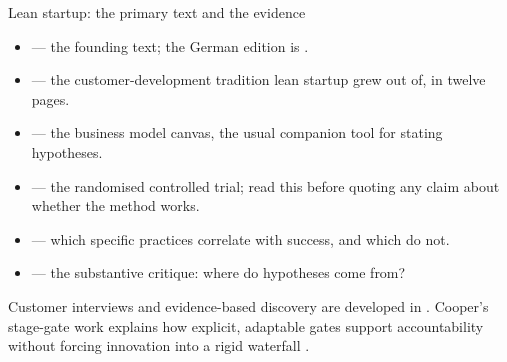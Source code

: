 \begin{v3topic}{Lean startup: the primary text and the evidence}
\begin{itemize}
  \item {} --- the founding text; the German
    edition is .
  \item {} --- the customer-development
    tradition lean startup grew out of, in twelve pages.
  \item {} --- the business
    model canvas, the usual companion tool for stating hypotheses.
  \item {} --- the
    randomised controlled trial; read this before quoting any claim about
    whether the method works.
  \item {} --- which specific
    practices correlate with success, and which do not.
  \item {} --- the substantive critique:
    where do hypotheses come from?
\end{itemize}
\end{v3topic}

Customer interviews and evidence-based discovery are developed in
\cite{constableTalkingHumansSuccess2014}.
Cooper's stage-gate work explains how explicit, adaptable gates support
accountability without forcing innovation into a rigid waterfall
\cite{cooperPerspectiveStageGateIdeatoLaunch2008}.
